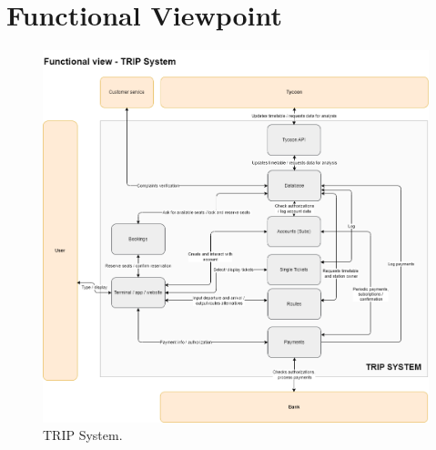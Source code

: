 \section{Functional Viewpoint}
\begin{figure}[H]
    \centering
    \includegraphics[width=\textwidth]{drawings/views_final_version/functional_view.png}
    \caption{TRIP System.}
    \label{fig:trip_system}
\end{figure}


